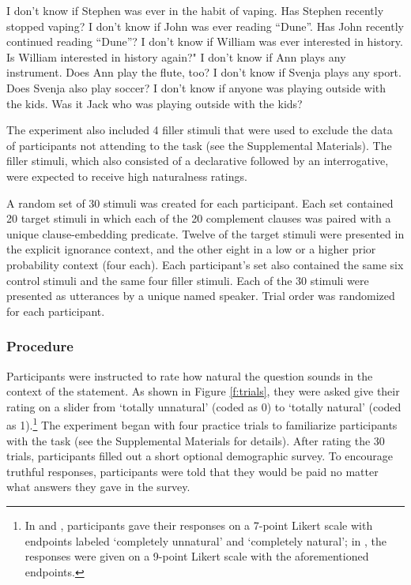 \documentclass[11pt,fleqn]{article}
\newcommand{\6}{\mbox{$[\hspace*{-.6mm}[$}}
\newcommand{\9}{\mbox{$]\hspace*{-.6mm}]$}}
\begin{document}
\begin{exe}
\ex\label{filler} 
\begin{xlist}
\ex I don't know if Stephen was ever in the habit of vaping. Has Stephen recently stopped vaping?
\ex I don't know if John was ever reading ``Dune''. Has John recently continued reading ``Dune''?
\ex I don't know if William was ever interested in history. Is William interested in history again?"
\ex I don't know if Ann plays any instrument. Does Ann play the flute, too?
\ex I don't know if Svenja plays any sport. Does Svenja also play soccer?
\ex I don't know if anyone was playing outside with the kids. Was it Jack who was playing outside with the kids?

\end{xlist}
\end{exe}

The experiment also included 4 filler stimuli that were used to exclude the data of participants not attending to the task (see the Supplemental Materials). The filler stimuli, which also consisted of a declarative followed by an interrogative, were expected to receive high naturalness ratings.

A random set of 30 stimuli was created for each participant. Each set contained 20 target stimuli in which each of the 20 complement clauses was paired with a unique clause-embedding predicate. Twelve of the target stimuli were presented in the explicit ignorance context, and the other eight in a low or a higher prior probability context (four each). Each participant's set also contained the same six control stimuli and the same four filler stimuli. Each of the 30 stimuli were presented as utterances by a unique named speaker. Trial order was randomized for each participant. 

\subsubsection{Procedure}

Participants were instructed to rate how natural the question sounds in the context of the statement. As shown in Figure \ref{f:trials}, they were asked give their rating on a slider from `totally unnatural' (coded as 0) to `totally natural' (coded as 1).\footnote{In \citealt[Exp.~3]{mandelkern-etal2020} and \citealt[Exp.1]{kalomoiros-schwarz2024}, participants gave their responses on a 7-point Likert scale with endpoints labeled `completely unnatural' and `completely natural';  in \citealt[Exp.~2]{kalomoiros-schwarz2024}, the responses were given on a 9-point Likert scale with the aforementioned endpoints.}
The experiment began with four practice trials to familiarize participants with the task (see the Supplemental Materials for details). After rating the 30 trials, participants filled out a short optional demographic survey. To encourage truthful responses, participants were told that they would be paid no matter what answers they gave in the survey.
\end{document}
